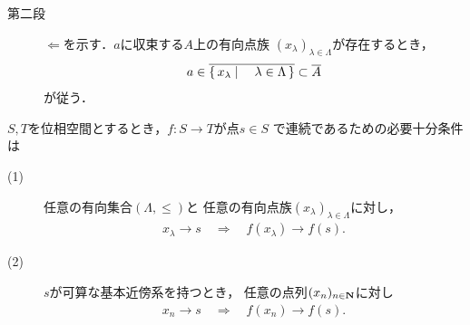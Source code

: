 \begin{prf}
\begin{description}
			\item[第二段] $\Longleftarrow$を示す．$a$に収束する$A$上の有向点族
				$(x_\lambda)_{\lambda \in \Lambda}$が存在するとき，
				\begin{align}
					a \in \overline{\left\{\, x_\lambda \mid \quad \lambda \in \Lambda\, \right\}} 
					\subset \overline{A}
				\end{align}
				が従う．
				\QED
		\end{description}
	\end{prf}
	
	\begin{screen}
		\begin{thm}
			$S,T$を位相空間とするとき，$f:S \longrightarrow T$が点$s \in S$
			で連続であるための必要十分条件は
			\begin{description}
				\item[(1)] 任意の有向集合$(\Lambda,\leq)$と
					任意の有向点族$(x_\lambda)_{\lambda \in \Lambda}$に対し，
					\begin{align}
						x_\lambda \longrightarrow s \quad \Longrightarrow \quad
						f(x_\lambda) \longrightarrow f(s).
					\end{align}
					
				\item[(2)] $s$が可算な基本近傍系を持つとき，
					任意の点列$(x_n)_{n \in \mathbf{N}}$に対し
					\begin{align}
						x_n \longrightarrow s \quad \Longrightarrow \quad
						f(x_n) \longrightarrow f(s).
					\end{align}
			\end{description}
		\end{thm}
	\end{screen}
	
